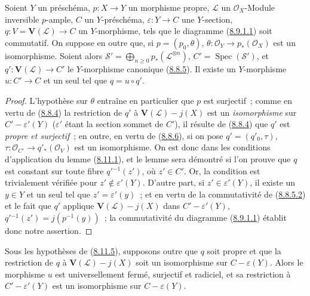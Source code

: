 \begin{lemma}[8.11.5]
\label{II.8.11.5-fr}
Soient $Y$ un préschéma, $p:X\to Y$ un morphisme propre, $\mathcal{L}$ un
$\mathcal{O}_X$-Module inversible $p$-ample, $C$ un $Y$-préschéma,
$\varepsilon:Y\to C$ une $Y$-section,
$q:V=\mathbf{V}(\mathcal{L})\to C$ un $Y$-morphisme, tels que le diagramme
(\hyperref[II.8.9.1.1-fr]{8.9.1.1}) soit commutatif. On suppose en outre que,
si $p=(p_0,\theta)$,
$\theta:\mathcal{O}_Y\to p_*(\mathcal{O}_X)$ est un isomorphisme. Soient alors
$\mathcal{S}'=\bigoplus_{n\geqslant0}p_*(\mathcal{L}^{\otimes n})$,
$C'=\operatorname{Spec}(\mathcal{S}')$, et
$q':\mathbf{V}(\mathcal{L})\to C'$ le $Y$-morphisme canonique
(\hyperref[II.8.8.5-fr]{8.8.5}). Il existe un $Y$-morphisme $u:C'\to C$ et
un seul tel que $q=u\circ q'$.
\end{lemma}

\begin{proof}
L'hypothèse sur $\theta$ entraîne en particulier que $p$ est surjectif~;
comme en vertu de (\hyperref[II.8.8.4-fr]{8.8.4}) la restriction de $q'$ à
$\mathbf{V}(\mathcal{L})-j(X)$ est un \emph{isomorphisme} sur
$C'-\varepsilon'(Y)$ ($\varepsilon'$ étant la section sommet de $C'$), il
résulte de (\hyperref[II.8.8.4-fr]{8.8.4}) que $q'$ est \emph{propre et
surjectif}~; en outre, en vertu de (\hyperref[II.8.8.6-fr]{8.8.6}), si on pose
$q'=(q'_0,\tau)$,
$\tau:\mathcal{O}_{C'}\to q'_*(\mathcal{O}_V)$ est un isomorphisme. On est
donc dans les conditions d'application du lemme
(\hyperref[II.8.11.1-fr]{8.11.1}), et le lemme sera démontré si l'on prouve
que $q$ est constant sur toute fibre $q'{}^{-1}(z')$, où $z'\in C'$. Or, la
condition est trivialement vérifiée pour $z'\notin\varepsilon'(Y)$. D'autre
part, si $z'\in\varepsilon'(Y)$, il existe un $y\in Y$ et un seul tel que
$z'=\varepsilon'(y)$~; et en vertu de la commutativité de
(\hyperref[II.8.8.5.2-fr]{8.8.5.2}) et le fait que $q'$ applique
$\mathbf{V}(\mathcal{L})-j(X)$ dans $C'-\varepsilon'(Y)$,
$q'{}^{-1}(z')=j(p^{-1}(y))$~; la commutativité du diagramme
(\hyperref[II.8.9.1.1-fr]{8.9.1.1}) établit donc notre assertion.
\end{proof}

\begin{corollary}[8.11.6]
\label{II.8.11.6-fr}
Sous les hypothèses de (\hyperref[II.8.11.5-fr]{8.11.5}), supposons outre que
$q$ soit propre et que la restriction de $q$ à
$\mathbf{V}(\mathcal{L})-j(X)$ soit un isomorphisme sur
$C-\varepsilon(Y)$. Alors le morphisme $u$ est universellement fermé,
surjectif et radiciel, et sa restriction à $C'-\varepsilon'(Y)$ est un
isomorphisme sur $C-\varepsilon(Y)$.
\end{corollary}

